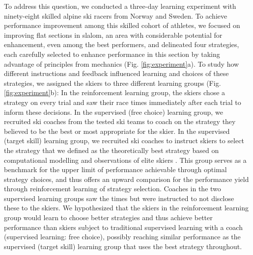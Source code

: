 \documentclass[pdflatex,sn-nature]{sn-jnl}%
\theoremstyle{thmstyleone}%
\theoremstyle{thmstyletwo}%
\theoremstyle{thmstylethree}%
\begin{document}
To address this question, we conducted a three-day learning experiment with ninety-eight skilled alpine ski racers from Norway and Sweden. To achieve performance improvement among this skilled cohort of athletes, we focused on improving flat sections in slalom, an area with considerable potential for enhancement, even among the best performers\cite{supej_new_2011}, and delineated four strategies, each carefully selected to enhance performance in this section by taking advantage of principles from mechanics (Fig. \ref{fig:experiment}a). To study how different instructions and feedback influenced learning and choices of these strategies, we assigned the skiers to three different learning groups (Fig. \ref{fig:experiment}b): In the reinforcement learning group, the skiers chose a strategy on every trial and saw their race times immediately after each trial to inform these decisions. In the supervised (free choice) learning group, we recruited ski coaches from the tested ski teams to coach on the strategy they believed to be the best or most appropriate for the skier. In the supervised (target skill) learning group, we recruited ski coaches to instruct skiers to select the strategy that we defined as the theoretically best strategy based on computational modelling \cite{lind_physics_2013, mote_accelerations_1983, luginbuhl_identification_2023} and observations of elite skiers \cite{reid_alpine_2020, magelssen_is_2022}. This group serves as a benchmark for the upper limit of performance achievable through optimal strategy choices, and thus offers an upward comparison for the performance yield through reinforcement learning of strategy selection. Coaches in the two supervised learning groups saw the times but were instructed to not disclose these to the skiers. We hypothesized that the skiers in the reinforcement learning group would learn to choose better strategies and thus achieve better performance than skiers subject to traditional supervised learning with a coach (supervised learning: free choice), possibly reaching similar performance as the supervised (target skill) learning group that uses the best strategy throughout. 
\end{document}
